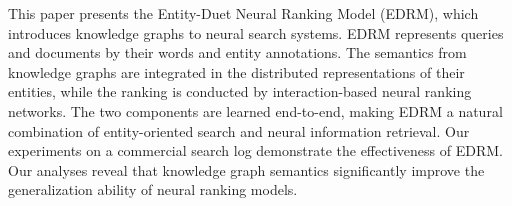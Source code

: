 This paper presents the Entity-Duet Neural Ranking Model (EDRM), which introduces knowledge graphs to neural search systems. EDRM represents queries and documents by their words and entity annotations. The semantics from knowledge graphs are integrated in the distributed representations of their entities, while the ranking is conducted by interaction-based neural ranking networks. The two components are learned end-to-end, making EDRM a natural combination of entity-oriented search and neural information retrieval. Our experiments on a commercial search log demonstrate the effectiveness of EDRM. Our analyses reveal that knowledge graph semantics significantly improve the generalization ability of neural ranking models.
